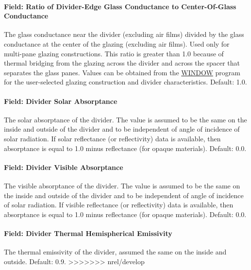 \paragraph{Field: Ratio of Divider-Edge Glass Conductance to Center-Of-Glass Conductance}\label{field-ratio-of-divider-edge-glass-conductance-to-center-of-glass-conductance}

The glass conductance near the divider (excluding air films) divided by the glass conductance at the center of the glazing (excluding air films). Used only for multi-pane glazing constructions. This ratio is greater than 1.0 because of thermal bridging from the glazing across the divider and across the spacer that separates the glass panes. Values can be obtained from the \href{https://windows.lbl.gov/software-tools#window-heading}{WINDOW} program for the user-selected glazing construction and divider characteristics. Default: 1.0.

\paragraph{Field: Divider Solar Absorptance}\label{field-divider-solar-absorptance}

The solar absorptance of the divider. The value is assumed to be the same on the inside and outside of the divider and to be independent of angle of incidence of solar radiation. If solar reflectance (or reflectivity) data is available, then absorptance is equal to 1.0 minus reflectance (for opaque materials). Default: 0.0.

\paragraph{Field: Divider Visible Absorptance}\label{field-divider-visible-absorptance}

The visible absorptance of the divider. The value is assumed to be the same on the inside and outside of the divider and to be independent of angle of incidence of solar radiation. If visible reflectance (or reflectivity) data is available, then absorptance is equal to 1.0 minus reflectance (for opaque materials). Default: 0.0.

\paragraph{Field: Divider Thermal Hemispherical Emissivity}\label{field-divider-thermal-hemispherical-emissivity}

The thermal emissivity of the divider, assumed the same on the inside and outside. Default: 0.9.
>>>>>>> nrel/develop

